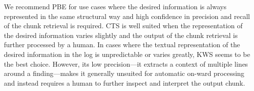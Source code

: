 We recommend PBE for use cases where the desired information is always
represented in the same structural way and high confidence in precision and
recall of the chunk retrieval is required.
CTS is well suited when the representation of the desired information varies
slightly and the output of the chunk retrieval is further processed by a human.
In cases where the textual representation of the desired information in the log
is unpredictable or varies greatly, KWS seems to be the best choice. However,
its low precision---it extracts a context of multiple lines around a
finding---makes it generally unsuited for automatic on-ward processing and
instead requires a human to further inspect and interpret the output chunk.
